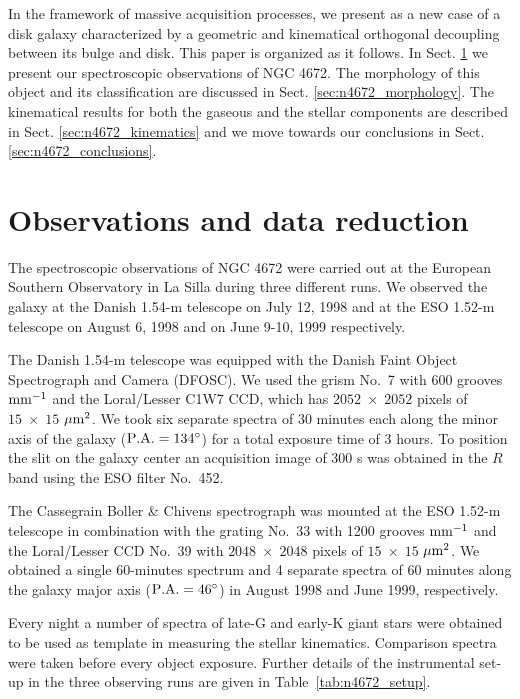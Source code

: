 \documentclass[twocolumns]{aa}
\def\dg{^\circ}
\begin{document}
In the framework of massive acquisition processes, we pre\-sent
 as a new case of a disk
galaxy characterized by a geometric and kinematical orthogonal
decoupling between its bulge and disk. This paper is organized as it
follows. In Sect. \ref{sec:n4672_observations} we present our
spectroscopic observations of NGC 4672. The morphology of this object
and its classification are discussed in Sect.
\ref{sec:n4672_morphology}.  The kinematical results for both the
gaseous and the stellar components are described in Sect.
\ref{sec:n4672_kinematics} and we move
towards our conclusions in Sect. \ref{sec:n4672_conclusions}.


\section{Observations and data reduction}
\label{sec:n4672_observations}

The spectroscopic observations of NGC 4672 were carried out at the
European Southern Observatory in La Silla during three different runs.
We observed the galaxy at the Danish 1.54-m telescope on July 12, 1998
and at the ESO 1.52-m telescope on August 6, 1998 and on June 9-10,
1999 respectively.

The Danish 1.54-m telescope was equipped with the Danish Faint Object
Spectrograph and Camera (DFOSC). We used the grism No.~7 with 600
grooves $\rm mm^{-1}$ and the Loral/Lesser C1W7 CCD, which has
$2052\;\times\;2052$ pixels of $15\;\times\;15$ $\rm
\mu m^2$. 
We took six separate spectra of 30 minutes each along the minor axis
of the galaxy ($\rm P.A.=134\dg$) for a total exposure time of 3
hours. To position the slit on the galaxy center an acquisition image
of 300 s was obtained in the $R$ band using the ESO filter No.~452.

The Cassegrain Boller \& Chivens spectrograph was mo\-un\-ted at the
ESO 1.52-m telescope in combination with the grating No.~33 with 1200
grooves $\rm mm^{-1}$ and the Loral/Lesser CCD No.~39 with
$2048\;\times\;2048$ pixels of $15\;\times\;15$ $\rm \mu m^2$.  We
obtained a single 60-minutes spectrum and 4 separate spectra of 60
minutes along the galaxy major axis ($\rm P.A.=46\dg$) in August 1998
and June 1999, respectively.

Every night a number of spectra of late-G and early-K giant stars were
obtained to be used as template in measuring the stellar
kinematics. Comparison spectra were taken before every object
exposure. Further details of the instrumental set-up in the three
observing runs are given in Table~\ref{tab:n4672_setup}.
\end{document}
